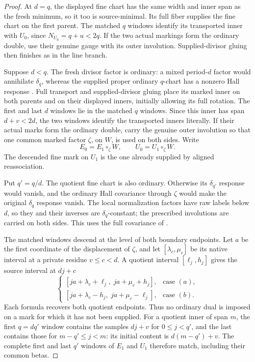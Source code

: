 \documentclass[11pt,a4paper]{amsart}
\numberwithin{equation}{section}
\theoremstyle{plain}
\theoremstyle{definition}
\begin{document}
\begin{proof}
At \(d=q\), the displayed fine chart has the same width and inner
span as the fresh minimum, so it too is source-minimal.  Its full
fiber supplies the fine chart on the first parent.  The matched
\(q\) windows identify its transported inner with \(U_0\), since
\(N_{U_0}=q+u<2q\).  If the two actual markings form the ordinary
double, use their genuine gauge with its outer involution.
Supplied-divisor gluing then finishes as in the line branch.

Suppose \(d<q\).  The fresh divisor factor is ordinary: a mixed
period-\(d\) factor would annihilate \(\delta_q\), whereas the
supplied proper ordinary \(q\)-chart has a nonzero Hall response
\cite[Mixed-vanishing lemma and factor recovery at a prescribed
period]{Shields2026Readout}.
Full transport and supplied-divisor gluing place its marked inner
on both parents and on their displayed inners, initially allowing
its full rotation.  The first and last \(d\) windows lie in the
matched \(q\) windows.  Since this inner has span \(d+v<2d\), the
two windows identify the transported inners literally.  If their
actual marks form the ordinary double, carry the genuine outer
involution so that one common marked factor \(\zeta\), on \(W\),
is used on both sides.  Write
\[
 E_0=E_1\circ_\zeta W,\qquad U_0=U_1\circ_\zeta W.
\]
The descended fine mark on \(U_1\) is the one already supplied by
aligned reassociation.

Put \(q'=q/d\).  The quotient fine chart is also ordinary.
Otherwise its \(\delta_{q'}\) response would vanish, and the ordinary
Hall covariance through \(\zeta\) would make the original
\(\delta_q\) response vanish.  The local normalization factors have
raw labels below \(d\), so they and their inverses are
\(\delta_q\)-constant; the prescribed involutions are carried on
both sides.  This uses the full covariance of
\cite[Composition covariance]{Shields2026Readout}.

The matched windows descend at the level of both boundary endpoints.
Let \(a\) be the first coordinate of the displacement of \(\zeta\),
and let \([\lambda_c,\mu_c]\) be its native interval at a private
residue \(v\le c<d\).  A quotient interval \([\ell_j,h_j]\) gives
the source interval at \(dj+c\)
\[
 \begin{cases}
 [ja+\lambda_c+\ell_j,\;ja+\mu_c+h_j],&\text{case }(a),\\
 [ja+\lambda_c-h_j,\;ja+\mu_c-\ell_j],&\text{case }(b).
 \end{cases}
\]
Each formula recovers both quotient endpoints.  Thus no ordinary
dual is imposed on a mark for which it has not been supplied.
For a quotient inner of span \(m\), the first \(q=dq'\) window
contains the samples \(dj+v\) for \(0\le j<q'\), and the last
contains those for \(m-q'\le j<m\): its initial content is
\(d(m-q')+v\).  The complete first and last \(q'\) windows of
\(E_1\) and \(U_1\) therefore match, including their common betas.


\end{proof}
\end{document}
